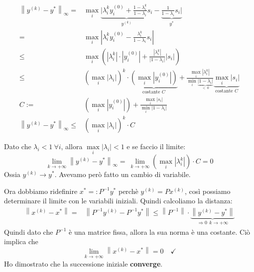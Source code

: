 \documentclass{article}
\begin{document}
\begin{align*}
    \left\|y^{(k)}-y^\ast\right\|_\infty=   & \max_{i}\underbrace{|\lambda_i^ky_i^{(0)}+\frac{1-\lambda_i^k}{1-\lambda_i}s_i}_{y^{(k)}}-\underbrace{\frac{1}{1-\lambda_i}s_i|}_{y^\ast}                                                                                                                                                              \\
    =                                       & \max_{i}\left|\lambda_i^ky_i^{(0)}-\frac{\lambda_i^k}{1-\lambda_i}s_i\right|                                                                                                                                                                                                                           \\
    \le                                     & \max_i \left(\left|\lambda_i^k\right|\cdot\left|y_i^{(0)}\right|+\frac{\left|\lambda_i^k\right|}{\left|1-\lambda_i\right|}\left|s_i\right|\right)                                                                                                                                                      \\
    \le                                     & \left(\max_i \left|\lambda_i\right|\right)^k\cdot\underbrace{\left(\max_i \left|y_i^{(0)}\right|\right)}_{\text{costante }C}+\frac{\underset{i}{\max} \left|\lambda_i^k\right|}{\underset{i}{\min}\underbrace{\left|1-\lambda_i\right|}_{<\ 0}}\underbrace{\max_i\left|s_i\right|}_{\text{costante }C} \\
    C:=                                     & \left(\max_i \left|y_i^{(0)}\right|\right)+\frac{\underset{i}{\max}\left|s_i\right|}{\underset{i}{\min}\left|1-\lambda_i\right|}                                                                                                                                                                       \\
    \left\|y^{(k)}-y^\ast\right\|_\infty\le & \left(\max_i\left|\lambda_i\right|\right)^k\cdot C
\end{align*}

Dato che $\lambda_i<1\ \forall i$, allora $\underset{i}{\max}\left|\lambda_i\right|<1$ e se faccio il limite:
\[\lim_{k\to+\infty}\left\|y^{(k)}-y^\ast\right\|_\infty=\ \boxed{\lim_{k\to+\infty}\left(\max_i\left|\lambda_i^k\right|\right)\cdot C=0}\]
Ossia $y^{(k)}\to y^\ast$. Avevamo però fatto un cambio di variabile.

Ora dobbiamo ridefinire $x^\ast=:P^{-1}y^\ast$ perchè $y^{(k)}=Px^{(k)}$, così possiamo determinare il limite con le variabili iniziali. Quindi calcoliamo la distanza:
\begin{align*}
    \left\|x^{(k)}-x^\ast\right\|= & \left\|P^{-1}y^{(k)}-P^{-1}y^\ast\right\|\le\left\|P^{-1}\right\|\cdot\underbrace{\left\|y^{(k)}-y^\ast\right\|}_{\text{$\Rightarrow0\ \ k\to+\infty$}}
\end{align*}
Quindi dato che $P^{-1}$ è una matrice fissa, allora la sua norma è una costante. Ciò implica che \[\lim_{k\to+\infty}\left\|x^{(k)}-x^\ast\right\|=0\quad\checkmark\]
Ho dimostrato che la successione iniziale \textbf{converge}.
\end{document}
